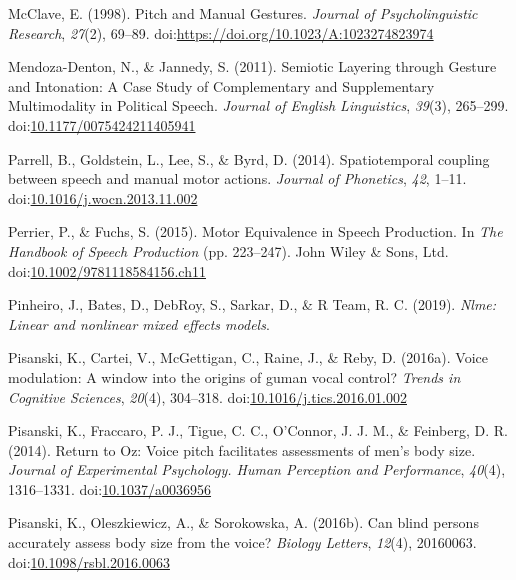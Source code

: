 \documentclass[
  man,floatsintext]{apa6}
\newlength{\cslhangindent}
\newenvironment{cslreferences}%
  {\setlength{\parindent}{0pt}%
  \everypar{\setlength{\hangindent}{\cslhangindent}}\ignorespaces}%
  {\par}
\begin{document}
\begin{cslreferences}
\leavevmode\hypertarget{ref-mcclavePitchManualGestures1998}{}%
McClave, E. (1998). Pitch and Manual Gestures. \emph{Journal of Psycholinguistic Research}, \emph{27}(2), 69--89. doi:\href{https://doi.org/https://doi.org/10.1023/A:1023274823974}{https://doi.org/10.1023/A:1023274823974}

\leavevmode\hypertarget{ref-mendoza-dentonSemioticLayeringGesture2011}{}%
Mendoza-Denton, N., \& Jannedy, S. (2011). Semiotic Layering through Gesture and Intonation: A Case Study of Complementary and Supplementary Multimodality in Political Speech. \emph{Journal of English Linguistics}, \emph{39}(3), 265--299. doi:\href{https://doi.org/10.1177/0075424211405941}{10.1177/0075424211405941}

\leavevmode\hypertarget{ref-parrellSpatiotemporalCouplingSpeech2014}{}%
Parrell, B., Goldstein, L., Lee, S., \& Byrd, D. (2014). Spatiotemporal coupling between speech and manual motor actions. \emph{Journal of Phonetics}, \emph{42}, 1--11. doi:\href{https://doi.org/10.1016/j.wocn.2013.11.002}{10.1016/j.wocn.2013.11.002}

\leavevmode\hypertarget{ref-perrierMotorEquivalenceSpeech2015}{}%
Perrier, P., \& Fuchs, S. (2015). Motor Equivalence in Speech Production. In \emph{The Handbook of Speech Production} (pp. 223--247). John Wiley \& Sons, Ltd. doi:\href{https://doi.org/10.1002/9781118584156.ch11}{10.1002/9781118584156.ch11}

\leavevmode\hypertarget{ref-pinheiroNlmeLinearNonlinear2019}{}%
Pinheiro, J., Bates, D., DebRoy, S., Sarkar, D., \& R Team, R. C. (2019). \emph{Nlme: Linear and nonlinear mixed effects models}.

\leavevmode\hypertarget{ref-pisanskiVoiceModulationWindow2016}{}%
Pisanski, K., Cartei, V., McGettigan, C., Raine, J., \& Reby, D. (2016a). Voice modulation: A window into the origins of guman vocal control? \emph{Trends in Cognitive Sciences}, \emph{20}(4), 304--318. doi:\href{https://doi.org/10.1016/j.tics.2016.01.002}{10.1016/j.tics.2016.01.002}

\leavevmode\hypertarget{ref-pisanskiReturnOzVoice2014}{}%
Pisanski, K., Fraccaro, P. J., Tigue, C. C., O'Connor, J. J. M., \& Feinberg, D. R. (2014). Return to Oz: Voice pitch facilitates assessments of men's body size. \emph{Journal of Experimental Psychology. Human Perception and Performance}, \emph{40}(4), 1316--1331. doi:\href{https://doi.org/10.1037/a0036956}{10.1037/a0036956}

\leavevmode\hypertarget{ref-pisanskiCanBlindPersons2016}{}%
Pisanski, K., Oleszkiewicz, A., \& Sorokowska, A. (2016b). Can blind persons accurately assess body size from the voice? \emph{Biology Letters}, \emph{12}(4), 20160063. doi:\href{https://doi.org/10.1098/rsbl.2016.0063}{10.1098/rsbl.2016.0063}


\end{cslreferences}
\end{document}
